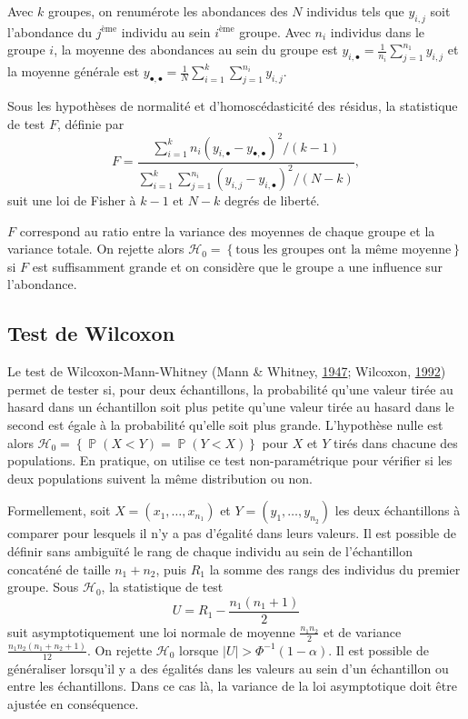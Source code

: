 \documentclass[12pt,a4paper]{reedthesis}
\DeclareMathOperator*{\prob}{\mathbb{P}}
\newcommand \PP [1]{\prob\left({#1}\right)}
\theoremstyle{definition}
\theoremstyle{definition}
\theoremstyle{definition}
\theoremstyle{remark}
\begin{document}
Avec \(k\) groupes, on renumérote les abondances des \(N\) individus tels que \(y_{i,j}\) soit l'abondance du \(j^{\text{ème}}\) individu au sein \(i^{\text{ème}}\) groupe. Avec \(n_i\) individus dans le groupe \(i\), la moyenne des abondances au sein du groupe est \(y_{i,\bullet} = \frac{1}{n_i}\sum_{j = 1}^{n_1} y_{i,j}\) et la moyenne générale est \(y_{\bullet, \bullet} = \frac{1}{N} \sum_{i=1}^k \sum_{j = 1}^{n_i} y_{i,j}\).

Sous les hypothèses de normalité et d'homoscédasticité des résidus, la statistique de test \(F\), définie par
\begin{equation*}
F = \frac{\sum_{i = 1}^k n_i \left(y_{i,\bullet} - y_{\bullet, \bullet} \right)^2 / (k - 1)}{\sum_{i=1}^k \sum_{j = 1}^{n_i} \left(y_{i,j} - y_{i,\bullet} \right)^2 / (N - k)},
\end{equation*}
suit une loi de Fisher à \(k - 1\) et \(N - k\) degrés de liberté.

\(F\) correspond au ratio entre la variance des moyennes de chaque groupe et la variance totale. On rejette alors \(\mathcal{H}_0 = \left\{\text{tous les groupes ont la même moyenne}\right\}\) si \(F\) est suffisamment grande et on considère que le groupe a une influence sur l'abondance.

\hypertarget{test-de-wilcoxon}{%
\subsection{Test de Wilcoxon}\label{test-de-wilcoxon}}

Le test de Wilcoxon-Mann-Whitney (Mann \& Whitney, \protect\hyperlink{ref-mann1947test}{1947}; Wilcoxon, \protect\hyperlink{ref-wilcoxon1992individual}{1992}) permet de tester si, pour deux échantillons, la probabilité qu'une valeur tirée au hasard dans un échantillon soit plus petite qu'une valeur tirée au hasard dans le second est égale à la probabilité qu'elle soit plus grande.
L'hypothèse nulle est alors \(\mathcal{H}_0 = \left\{\PP{X < Y} = \PP {Y < X} \right\}\) pour \(X\) et \(Y\) tirés dans chacune des populations.
En pratique, on utilise ce test non-paramétrique pour vérifier si les deux populations suivent la même distribution ou non.

Formellement, soit \(X = (x_1, \ldots, x_{n_1})\) et \(Y = (y_1, \ldots, y_{n_2})\) les deux échantillons à comparer pour lesquels il n'y a pas d'égalité dans leurs valeurs. Il est possible de définir sans ambiguïté le rang de chaque individu au sein de l'échantillon concaténé de taille \(n_1 + n_2\), puis \(R_1\) la somme des rangs des individus du premier groupe. Sous \(\mathcal{H}_0\), la statistique de test
\begin{equation*}
U = R_1 - \frac{n_1(n_1 + 1)}{2}
\end{equation*}
suit asymptotiquement une loi normale de moyenne \(\frac{n_1n_2}{2}\) et de variance \(\frac{n_1 n_2(n_1 + n_2 + 1)}{12}\). On rejette \(\mathcal{H}_0\) lorsque \(\left|U\right| > \Phi^{-1}(1-\alpha)\).
Il est possible de généraliser lorsqu'il y a des égalités dans les valeurs au sein d'un échantillon ou entre les échantillons. Dans ce cas là, la variance de la loi asymptotique doit être ajustée en conséquence.
\end{document}
